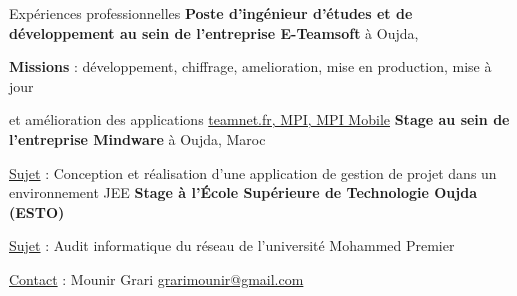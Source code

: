 \begin{rubric}{Expériences professionnelles}
%
%
	\textbf{Poste d'ingénieur d'études et de développement au sein de l’entreprise E-Teamsoft} à Oujda, 
     \hfill{} 
	\par \textbf{Missions} : développement, chiffrage, amelioration, mise en production,
                              mise à jour \par et amélioration des applications \url{teamnet.fr, MPI, MPI Mobile} 
%
%
%
	\textbf{Stage au sein de l’entreprise Mindware} à Oujda, Maroc
     \hfill{} 
    \par \underline{Sujet} : {Conception et réalisation d'une application de gestion de projet dans un environnement JEE}
%
    \textbf{Stage à l’École Supérieure de Technologie Oujda (ESTO)}
     \hfill{} 
    \par \underline{Sujet} : {Audit informatique du réseau de l'université Mohammed Premier}
	\par \underline{Contact} : Mounir Grari \href{mailto:grarimounir@gmail.com}{grarimounir@gmail.com}
%
%
%
\end{rubric}
